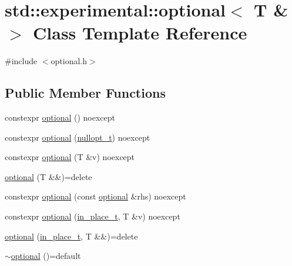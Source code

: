 \hypertarget{classstd_1_1experimental_1_1optional_3_01_t_01_6_01_4}{}\section{std\+:\+:experimental\+:\+:optional$<$ T \& $>$ Class Template Reference}
\label{classstd_1_1experimental_1_1optional_3_01_t_01_6_01_4}


{\ttfamily \#include $<$optional.\+h$>$}

\subsection*{Public Member Functions}
\begin{DoxyCompactItemize}
\item 
constexpr \mbox{\hyperlink{classstd_1_1experimental_1_1optional_3_01_t_01_6_01_4_af1ca4fe03c90cf9cb58e65fde8fd103f}{optional}} () noexcept
\item 
constexpr \mbox{\hyperlink{classstd_1_1experimental_1_1optional_3_01_t_01_6_01_4_a745fea438842ecd75aaf55b508a072ac}{optional}} (\mbox{\hyperlink{structstd_1_1experimental_1_1nullopt__t}{nullopt\+\_\+t}}) noexcept
\item 
constexpr \mbox{\hyperlink{classstd_1_1experimental_1_1optional_3_01_t_01_6_01_4_a10614cd2647a523b5b8d6ec4fff1bbd5}{optional}} (T \&v) noexcept
\item 
\mbox{\hyperlink{classstd_1_1experimental_1_1optional_3_01_t_01_6_01_4_ad7d66f5c33a6fb9ca9c0fdb25f61036e}{optional}} (T \&\&)=delete
\item 
constexpr \mbox{\hyperlink{classstd_1_1experimental_1_1optional_3_01_t_01_6_01_4_ad9dc3e3c32f40151798d6ce2f0435b0d}{optional}} (const \mbox{\hyperlink{classstd_1_1experimental_1_1optional}{optional}} \&rhs) noexcept
\item 
constexpr \mbox{\hyperlink{classstd_1_1experimental_1_1optional_3_01_t_01_6_01_4_a5c5cac399d59bc9d499a369367110289}{optional}} (\mbox{\hyperlink{structstd_1_1experimental_1_1in__place__t}{in\+\_\+place\+\_\+t}}, T \&v) noexcept
\item 
\mbox{\hyperlink{classstd_1_1experimental_1_1optional_3_01_t_01_6_01_4_accb8a2372c834051b76329222d6e737f}{optional}} (\mbox{\hyperlink{structstd_1_1experimental_1_1in__place__t}{in\+\_\+place\+\_\+t}}, T \&\&)=delete
\item 
\mbox{\hyperlink{classstd_1_1experimental_1_1optional_3_01_t_01_6_01_4_a6da1c8d60a81dde58445da2b33430a05}{$\sim$optional}} ()=default

\end{DoxyCompactItemize}
